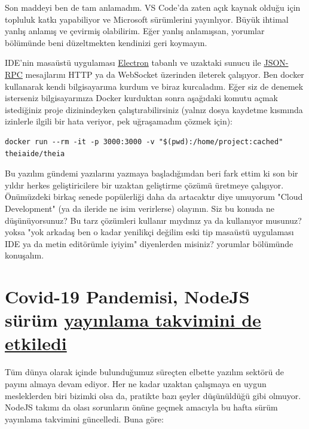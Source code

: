 \documentclass[11pt]{article}
\begin{document}
Son maddeyi ben de tam anlamadım. VS Code'da zaten açık kaynak olduğu için
topluluk katkı yapabiliyor ve Microsoft sürümlerini yayınlıyor. Büyük ihtimal
yanlış anlamış ve çevirmiş olabilirim. Eğer yanlış anlamışsan, yorumlar
bölümünde beni düzeltmekten kendinizi geri koymayın.

IDE'nin masaüstü uygulaması \href{https://www.electronjs.org/}{Electron} tabanlı ve uzaktaki sunucu ile \href{https://www.jsonrpc.org/specification}{JSON-RPC}
mesajlarını HTTP ya da WebSocket üzerinden ileterek çalışıyor. Ben docker
kullanarak kendi bilgisayarıma kurdum ve biraz kurcaladım. Eğer siz de denemek
isterseniz bilgisayarınıza Docker kurduktan sonra aşağıdaki komutu açmak
istediğiniz proje dizinindeyken çalıştırabilirsiniz (yalnız dosya kaydetme
kısmında izinlerle ilgili bir hata veriyor, pek uğraşamadım çözmek için):

\begin{verbatim}
docker run --rm -it -p 3000:3000 -v "$(pwd):/home/project:cached" theiaide/theia
\end{verbatim}

Bu yazılım gündemi yazılarını yazmaya başladığımdan beri fark ettim ki son bir
yıldır herkes geliştiricilere bir uzaktan geliştirme çözümü üretmeye
çalışıyor. Önümüzdeki birkaç senede popülerliği daha da artacaktır diye
umuyorum "Cloud Development" (ya da ileride ne isim verirlerse) olayının. Siz
bu konuda ne düşünüyorsunuz? Bu tarz çözümleri kullanır mıydınız ya da
kullanıyor musunuz? yoksa "yok arkadaş ben o kadar yenilikçi değilim eski tip
masaüstü uygulaması IDE ya da metin editörümle iyiyim" diyenlerden misiniz?
yorumlar bölümünde konuşalım.
\section{Covid-19 Pandemisi, NodeJS sürüm \href{https://nodejs.org/en/blog/announcements/adjusted-release-schedule-covid/}{yayınlama takvimini de etkiledi}}
\label{sec:orgb7eff4f}
Tüm dünya olarak içinde bulunduğumuz süreçten elbette yazılım sektörü de
payını almaya devam ediyor. Her ne kadar uzaktan çalışmaya en uygun
mesleklerden biri bizimki olsa da, pratikte bazı şeyler düşünüldüğü gibi
olmuyor. NodeJS takımı da olası sorunların önüne geçmek amacıyla bu hafta
sürüm yayınlama takvimini güncelledi. Buna göre:
\end{document}
